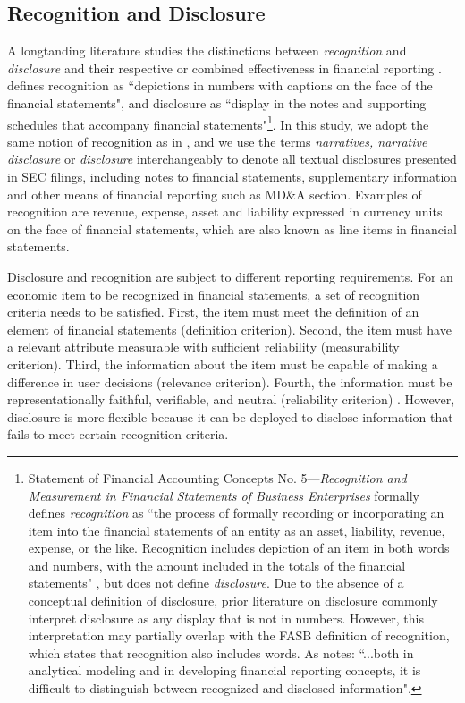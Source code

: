 \documentclass[a4paper]{article}
\begin{document}
\begin{spacing}{2}
\subsection{Recognition and Disclosure}
A longtanding literature studies the distinctions between \textit{recognition} and \textit{disclosure} and their respective or combined effectiveness in financial reporting \citep*{schipperRequiredDisclosuresFinancial2007, barthMarketEffectsRecognition2003, aboodyRecognitionDisclosureOil1996}. \citet[p. 301]{schipperRequiredDisclosuresFinancial2007} defines recognition as ``depictions in numbers with captions on the face of the financial statements", and disclosure as ``display in the notes and supporting schedules that accompany financial statements"\footnote{Statement of Financial Accounting Concepts No. 5---\textit{Recognition and Measurement in Financial Statements of Business Enterprises} formally defines \textit{recognition} as ``the process of formally recording or incorporating an item into the financial statements of an entity as an asset, liability, revenue, expense, or the like. Recognition includes depiction of an item in both words and numbers, with the amount included in the totals of the financial statements" \citep*[par. 6]{fasbStatementFinancialAccounting1984}, but does not define \textit{disclosure}. Due to the absence of a conceptual definition of disclosure, prior literature on disclosure commonly interpret disclosure as any display that is not in numbers. However, this interpretation may partially overlap with the FASB definition of recognition, which states that recognition also includes words. As \citet[p. 302]{schipperRequiredDisclosuresFinancial2007} notes: ``...both in analytical modeling and in developing financial reporting concepts, it is difficult to distinguish between recognized and disclosed information".}. In this study, we adopt the same notion of recognition as in \cite{schipperRequiredDisclosuresFinancial2007}, and we use the terms \textit{narratives, narrative disclosure} or \textit{disclosure} interchangeably to denote all textual disclosures presented in SEC filings, including notes to financial statements, supplementary information and other means of financial reporting such as MD\&A section. Examples of recognition are revenue, expense, asset and liability expressed in currency units on the face of financial statements, which are also known as line items in financial statements. 

Disclosure and recognition are subject to different reporting requirements. For an economic item to be recognized in financial statements, a set of recognition criteria needs to be satisfied. First, the item must meet the definition of an element of financial statements (definition criterion). Second, the item must have a relevant attribute measurable with sufficient reliability (measurability criterion). Third, the information about the item must be capable of making a difference in user decisions (relevance criterion). Fourth, the information must be representationally faithful, verifiable, and neutral (reliability criterion) \citep{fasbStatementFinancialAccounting1984}. However, disclosure is more flexible because it can be deployed to disclose information that fails to meet certain recognition criteria. 


\end{spacing}
\end{document}
